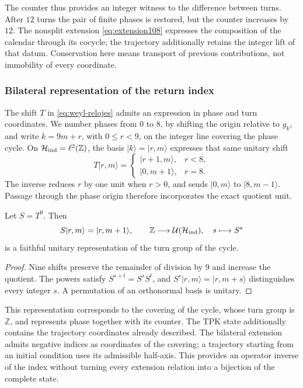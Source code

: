 The counter thus provides an integer witness to the difference between
turns. After \(12\) turns the pair of finite phases is restored, but
the counter increases by \(12\). The nonsplit extension
\eqref{eq:extension108} expresses the composition of the calendar through its
cocycle; the trajectory additionally retains the integer lift of that datum.
Conservation here means transport of previous contributions,
not immobility of every coordinate.

\subsubsection{Bilateral representation of the return index}

The shift \(T\) in \eqref{eq:weyl-relojes} admits an
expression in phase and turn coordinates. We number phases from \(0\) to
\(8\), by shifting the origin relative to \(g_k\), and
write \(k=9m+r\), with \(0\leq r<9\), on the integer line
covering the phase cycle. On
\(\mathcal H_{\rm ind}=\ell^2(\mathbb Z)\), the basis
\(|k\rangle=|r,m\rangle\) expresses that same unitary shift
\[
 T|r,m\rangle=
 \begin{cases}
 |r+1,m\rangle,&r<8,\\
 |0,m+1\rangle,&r=8.
 \end{cases}
\]
The inverse reduces \(r\) by one unit when \(r>0\), and sends
\(|0,m\rangle\) to \(|8,m-1\rangle\). Passage through the phase origin
therefore incorporates the exact quotient unit.

\begin{proposition}
\label{mono-ampl:representacion}
Let \(S=T^9\). Then
\[
 S|r,m\rangle=|r,m+1\rangle,\qquad
 \mathbb Z\longrightarrow\mathcal U(\mathcal H_{\rm ind}),
 \quad s\longmapsto S^s
\]
is a faithful unitary representation of the turn group of the cycle.
\end{proposition}
\begin{proof}
Nine shifts preserve the remainder of division by \(9\) and
increase the quotient. The powers satisfy
\(S^{s+t}=S^sS^t\), and \(S^s|r,m\rangle=|r,m+s\rangle\) distinguishes
every integer \(s\). A permutation of an orthonormal basis is unitary.
\end{proof}

This representation corresponds to the covering of the cycle, whose turn
group is \(\mathbb Z\), and represents phase together with its counter. The
TPK state additionally contains the trajectory coordinates already described.
The bilateral extension admits negative indices as coordinates of the
covering; a trajectory starting from an initial condition uses
its admissible half-axis. This provides an operator inverse
of the index without turning every extension relation into a bijection of the
complete state.

